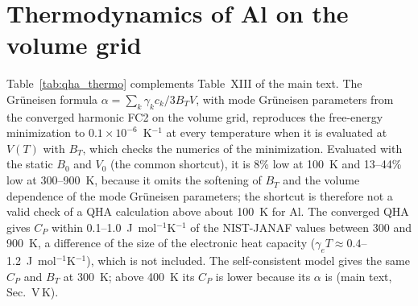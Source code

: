 \documentclass[aip,jap,reprint,amsmath,amssymb,floatfix]{revtex4-2}
\begin{document}


\section{Thermodynamics of Al on the volume grid}

Table~\ref{tab:qha_thermo} complements Table~XIII of the main text. The
Gr\"uneisen formula $\alpha=\sum_k\gamma_kc_k/3B_TV$, with mode Gr\"uneisen
parameters from the converged harmonic FC2 on the volume grid, reproduces the
free-energy minimization to $0.1\times10^{-6}$~K$^{-1}$ at every temperature
when it is evaluated at $V(T)$ with $B_T$, which checks the numerics of the
minimization. Evaluated with the static $B_0$ and $V_0$ (the common
shortcut), it is 8\% low at 100~K and 13--44\% low at 300--900~K, because it
omits the softening of $B_T$ and the volume dependence of the mode
Gr\"uneisen parameters; the shortcut is therefore not a valid check of a QHA
calculation above about 100~K for Al. The converged QHA gives $C_P$ within
0.1--1.0~J~mol$^{-1}$K$^{-1}$ of the NIST-JANAF values between 300 and
900~K, a difference of the size of the electronic heat capacity
($\gamma_eT\approx0.4$--1.2~J~mol$^{-1}$K$^{-1}$), which is not included.
The self-consistent model gives the same $C_P$ and $B_T$ at 300~K; above
400~K its $C_P$ is lower because its $\alpha$ is (main text,
Sec.~V\,K).




\end{document}
